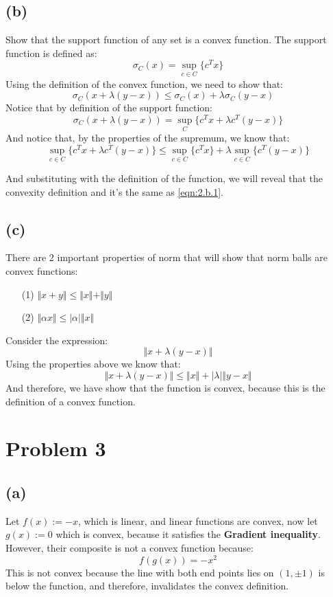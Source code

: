\documentclass[]{article}
\begin{document}
\subsection*{(b)}
    Show that the support function of any set is a convex function. The support function is defined as:
        $$
        \sigma_C(x) = \sup_{c \in C} \{c^T x\}
        $$
    Using the definition of the convex function, we need to show that:
        \begin{equation*}\label{eqn:2.b.1}\tag{2.b.1}
            \sigma_C(x + \lambda (y - x)) \le \sigma_C(x) + \lambda \sigma_C(y - x)
        \quad
        \end{equation*}
    Notice that by definition of the support function:
        $$
        \sigma_C(x + \lambda (y - x)) = \sup_C\{c^T x + \lambda c^T(y -x)\}
        $$
    And notice that, by the properties of the supremum, we know that:
        $$
        \sup_{c\in C} \{
            c^Tx + \lambda c^T(y - x)
        \} \le \sup_{c\in C}\{c^Tx\} + \lambda \sup_{c\in C}\{
            c^T(y - x)
        \}
        $$
    \par
    And substituting with the definition of the function, we will reveal that the convexity definition and it's the same as \ref{eqn:2.b.1}.

\subsection*{(c)}
    There are 2 important properties of norm that will show that norm balls are convex functions:
    \begin{enumerate}
        \item[(1)] $\Vert x + y \Vert \le \Vert x \Vert + \Vert y\Vert$
        \item[(2)] $\Vert \alpha x\Vert \le |\alpha| \Vert x\Vert$
    \end{enumerate}
    Consider the expression:
    $$
    \Vert x + \lambda (y - x)\Vert
    $$
    Using the properties above we know that:
    $$
    \Vert x + \lambda (y - x)\Vert  \le
        \Vert x\Vert + |\lambda| \Vert y - x\Vert
    $$
    And therefore, we have show that the function is convex, because this is the definition of a convex function.

\newpage
\section*{Problem 3}
\subsection*{(a)}
    Let $f(x) := -x$, which is linear, and linear functions are convex, now let $g(x):= 0$ which is convex, because it satisfies the \textbf{Gradient inequality}.
    However, their composite is not a convex function because:
    $$
    f(g(x)) = -x^2
    $$
    This is not convex because the line with both end points lies on $(1, \pm 1)$ is below the function, and therefore, invalidates the convex definition.
\end{document}
